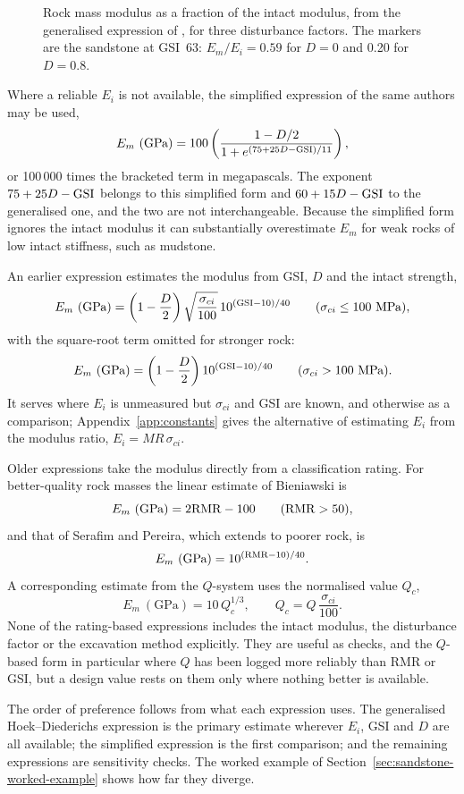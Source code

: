 \begin{figure}[htbp]
\centering
{}
\caption{Rock mass modulus as a fraction of the intact modulus, from the generalised expression of \citet{hoekdiederichs2006}, for three disturbance factors. The markers are the sandstone at GSI~63: $E_m/E_i = 0.59$ for $D = 0$ and 0.20 for $D = 0.8$.}
\label{fig:modulus-gsi}
\end{figure}

Where a reliable \(E_i\) is not available, the simplified expression of the
same authors may be used,
\[
E_m~(\text{GPa}) =
100
\left(
\frac{1-D/2}
{1+e^{(75+25D-\mathrm{GSI})/11}}
\right) ,
\]
or 100\,000 times the bracketed term in megapascals. The exponent
\(75+25D-\mathrm{GSI}\) belongs to this simplified form and \(60+15D-\mathrm{GSI}\) to the
generalised one, and the two are not interchangeable. Because the simplified
form ignores the intact modulus it can substantially overestimate \(E_m\) for
weak rocks of low intact stiffness, such as mudstone.

An earlier expression estimates the modulus from GSI, \(D\) and the intact
strength,
\[
E_m~(\text{GPa}) =
\left(1-\frac{D}{2}\right)
\sqrt{\frac{\sigma_{ci}}{100}}
\,
10^{(\mathrm{GSI}-10)/40}
\qquad
(\sigma_{ci} \leq 100~\text{MPa}) ,
\]
with the square-root term omitted for stronger rock:
\[
E_m~(\text{GPa}) =
\left(1-\frac{D}{2}\right)
10^{(\mathrm{GSI}-10)/40}
\qquad
(\sigma_{ci} > 100~\text{MPa}) .
\]
It serves where \(E_i\) is unmeasured but \(\sigma_{ci}\) and GSI are known,
and otherwise as a comparison; Appendix~\ref{app:constants} gives the
alternative of estimating \(E_i\) from the modulus ratio,
\(E_i = MR\,\sigma_{ci}\).

Older expressions take the modulus directly from a classification rating. For
better-quality rock masses the linear estimate of Bieniawski is
\[
E_m~(\text{GPa}) = 2\mathrm{RMR} - 100
\qquad
(\mathrm{RMR} > 50) ,
\]
and that of Serafim and Pereira, which extends to poorer rock, is
\[
E_m~(\text{GPa}) =
10^{(\mathrm{RMR}-10)/40} .
\]
A corresponding estimate from the $Q$-system uses the normalised value
\(Q_c\),
\[
E_m~(\text{GPa}) =
10\,Q_c^{1/3} ,
\qquad
Q_c =
Q\,\frac{\sigma_{ci}}{100} .
\]
None of the rating-based expressions includes the intact modulus, the
disturbance factor or the excavation method explicitly. They are useful as
checks, and the $Q$-based form in particular where $Q$ has been logged more
reliably than RMR or GSI, but a design value rests on them only where nothing
better is available.

The order of preference follows from what each expression uses. The
generalised Hoek--Diederichs expression is the primary estimate wherever
\(E_i\), GSI and \(D\) are all available; the simplified expression is the
first comparison; and the remaining expressions are sensitivity checks. The
worked example of Section~\ref{sec:sandstone-worked-example} shows how far
they diverge.

